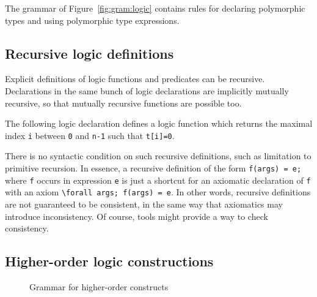 The grammar of Figure~\ref{fig:gram:logic} contains rules for
declaring polymorphic types and using polymorphic type
expressions.


\subsection{Recursive logic definitions}
Explicit definitions of logic functions and predicates can be
recursive. Declarations in the same bunch of logic declarations are
implicitly mutually recursive, so that mutually recursive functions are
possible too.

\begin{example}
  The following logic declaration
  defines a logic function which returns the maximal index \lstinline|i| between
  \lstinline|0| and \lstinline|n-1| such that \lstinline|t[i]=0|.
\end{example}

%  

There is no syntactic condition on such recursive
definitions, such as limitation to primitive recursion. In essence, a
recursive definition of the form \lstinline+f(args) = e;+ where
\lstinline+f+ occurs in expression \lstinline+e+ is just a shortcut
for an axiomatic declaration of \lstinline+f+ with an axiom
\lstinline+\forall args; f(args) = e+.  In other words, recursive
definitions are not guaranteed to be consistent, in the same way that
axiomatics may introduce inconsistency. Of course, tools might provide
a way to check consistency.

\subsection{Higher-order logic constructions}
\label{sec:higherorder}

\experimental

\begin{figure}[t]
  \begin{cadre}
      
    \end{cadre}
  \caption{Grammar for higher-order constructs}
\label{fig:gram:higherorder}
\end{figure}

